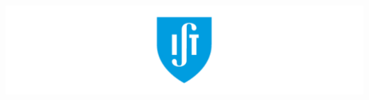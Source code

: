 \documentclass[sigchi]{acmart}
\begin{document}
\begin{teaserfigure}
\includegraphics[width=\textwidth]{teaser}
\end{teaserfigure}

\maketitle



\clearpage




\clearpage


\end{document}
